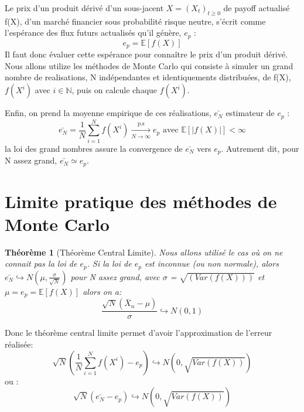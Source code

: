 \documentclass[12pt]{report}
\newtheorem{theo}{Théorème}[section]
\begin{document}
Le prix d'un produit dérivé d'un sous-jacent $X=(X_t)_{t\geq0}$ de payoff actualisé f(X), d'un marché financier sous probabilité risque neutre, s’écrit
comme l’espérance des flux futurs actualisés qu’il génère, $e_p$ :
\begin{equation}
	e_p = \mathbb{E}[f(X)]
\end{equation}
Il faut donc évaluer cette espérance pour connaître le prix d’un produit dérivé.
Nous allons utilize les méthodes de Monte Carlo qui consiste à simuler un grand
nombre de realisations, N indépendantes et identiquements distribuées, de f(X),
$f(X^i)$ avec $i\in \mathbb{N}$, puis on calcule chaque $f(X^i)$.

Enfin, on prend la moyenne empirique de ces réalisations, $\bar{e_N}$ estimateur de $e_p$ :
\begin{equation}
	\bar{e_N}=\frac{1}{N}\sum_{i=1}^{N} f(X^i) \xrightarrow[N\rightarrow{\infty}]{\text{p.s}} e_p \text{~avec~} \mathbb{E}[|f(X)|]<\infty
\end{equation}
la loi des grand nombres assure la convergence de $\bar{e_N}$ vers $e_p$.
Autrement dit, pour N assez grand, $\bar{e_N} \simeq e_p$.

\section{Limite pratique des méthodes de Monte Carlo}

\begin{theo}[Théorème Central Limite]\label{TCL}
	Nous allons utilisé le cas où on ne connait pas la loi de $e_p$.
	Si la loi de $e_p$ est inconnue (ou non normale), alors $\bar{e_N}\hookrightarrow N(\mu,\frac{\sigma}{\sqrt{N}})$ pour N assez grand, avec $\sigma$ = $\sqrt{(Var(f(X)))}$  et $\mu=e_p =\mathbb{E}[f(X)]$  alors on a:
	\begin{equation}
		\frac{\sqrt{N}(\bar{X}_n-\mu)}{\sigma}\hookrightarrow N(0,1)
	\end{equation}
\end{theo}

Donc le théorème central limite permet d'avoir l'approximation de l'erreur réalisée:
\begin{equation}
	\label{eq:approximation-erreur}
	\sqrt{N}(\frac{1}{N}\sum_{i=1}^{N}f(X^i)-e_p)\hookrightarrow N(0,\sqrt{Var(f(X))})
\end{equation}
ou :
\begin{equation}
	\sqrt{N}(\bar{e_N}-e_p)\hookrightarrow N(0,\sqrt{Var(f(X))})
\end{equation}
\end{document}
